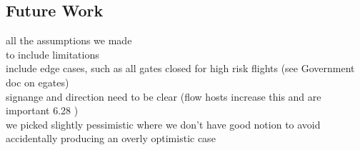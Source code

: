 \documentclass[10pt]{article}
\begin{document}
\subsection{Future Work}
all the assumptions we made \\
to include limitations \\
include edge cases, such as all gates closed for high risk flights (see Government doc on \glspl{egate}) \\
signange and direction need to be clear (flow hosts increase this and are important 6.28 \cite{Inspection_eGates}) \\
we picked slightly pessimistic where we don't have good notion to avoid accidentally producing an overly optimistic case

{\footnotesize
}
% 
\end{document}
